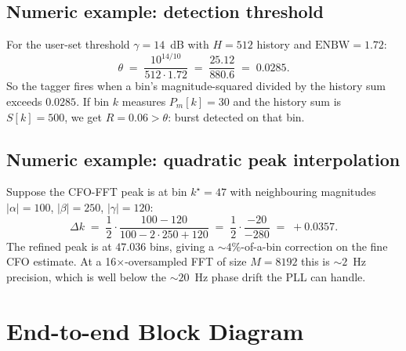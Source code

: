 \documentclass[11pt,a4paper]{article}
\begin{document}
\subsection{Numeric example: detection threshold}

For the user-set threshold $\gamma = 14$~dB with $H = 512$ history and
$\mathrm{ENBW} = 1.72$:
\begin{equation*}
\theta \;=\; \frac{10^{14/10}}{512 \cdot 1.72}
       \;=\; \frac{25.12}{880.6}
       \;=\; 0.0285.
\end{equation*}
So the tagger fires when a bin's magnitude-squared divided by the
history sum exceeds $0.0285$. If bin $k$ measures
$P_m[k] = 30$ and the history sum is $S[k] = 500$, we get $R = 0.06 >
\theta$: burst detected on that bin.

\subsection{Numeric example: quadratic peak interpolation}

Suppose the CFO-FFT peak is at bin $k^\star = 47$ with neighbouring
magnitudes $|\alpha| = 100$, $|\beta| = 250$, $|\gamma| = 120$:
\begin{equation*}
\Delta k \;=\; \frac{1}{2}\cdot\frac{100 - 120}{100 - 2\cdot 250 + 120}
       \;=\; \frac{1}{2}\cdot\frac{-20}{-280}
       \;=\; +0.0357.
\end{equation*}
The refined peak is at $47.036$ bins, giving a $\sim 4\%$-of-a-bin
correction on the fine CFO estimate. At a 16$\times$-oversampled FFT of
size $M = 8192$ this is $\sim 2$~Hz precision, which is well below the
$\sim 20$~Hz phase drift the PLL can handle.

\section{End-to-end Block Diagram}
\end{document}
